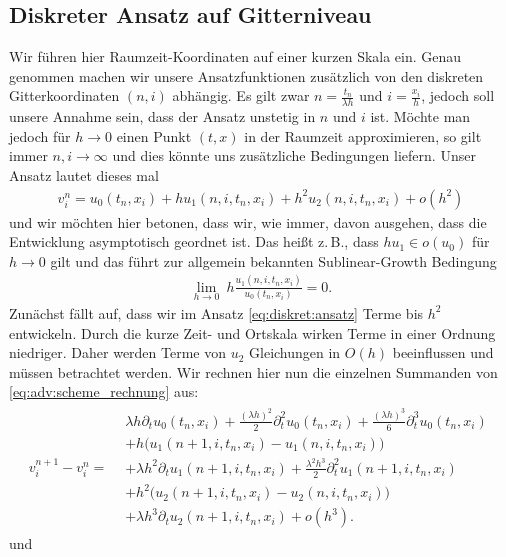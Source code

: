 \subsection {Diskreter Ansatz auf Gitterniveau} \label{sec:diskret}

Wir führen hier Raumzeit-Koordinaten auf einer kurzen Skala ein.
Genau genommen machen wir unsere Ansatzfunktionen zusätzlich von den diskreten Gitterkoordinaten $(n,i)$ abhängig.
Es gilt zwar $n = \frac {t_n} {\lambda h}$ und $i = \frac {x_i}{h}$, jedoch soll unsere Annahme sein, dass der Ansatz unstetig in $n$ und $i$ ist.
Möchte man jedoch für $h \to 0$ einen Punkt $(t,x)$ in der Raumzeit approximieren, so gilt immer $n,i \to \infty$ und dies könnte uns zusätzliche Bedingungen liefern.
Unser Ansatz lautet dieses mal
\begin{align}\label{eq:diskret:ansatz}
v^n_i = u_0(t_n, x_i) + h u_1(n, i, t_n, x_i) + h^2 u_2(n, i, t_n, x_i) + o(h^2)
\end{align}
und wir möchten hier betonen, dass wir, wie immer, davon ausgehen, dass die Entwicklung asymptotisch geordnet ist.
Das heißt z.\,B., dass $h u_1 \in o(u_0)$ für $h \to 0$ gilt und das führt zur allgemein bekannten Sublinear-Growth Bedingung
\begin{align}\label{eq:diskret:sublineargrowth}
\lim_{h \to 0} \: h \frac{u_1(n, i, t_n, x_i)}{u_0(t_n, x_i)} = 0.
\end{align}
Zunächst fällt auf, dass wir im Ansatz \eqref{eq:diskret:ansatz} Terme bis $h^2$ entwickeln.
Durch die kurze Zeit- und Ortskala wirken Terme in einer Ordnung niedriger.
Daher werden Terme von $u_2$ Gleichungen in $O(h)$ beeinflussen und müssen betrachtet werden.
Wir rechnen hier nun die einzelnen Summanden von \eqref{eq:adv:scheme_rechnung} aus:
{
\begin{align} \label{eq:diskret:diff1}
v^{n+1}_i - v^n_i =
\begin{split}
&\lambda h \partial_t u_0(t_n, x_i) + \frac {(\lambda h)^2}{2} \partial^2_t u_0(t_n, x_i) + \frac {(\lambda h)^3}{6} \partial^3_t u_0(t_n, x_i)\\
&+ h \bigl( u_1(n+1, i, t_n, x_i) - u_1(n, i, t_n, x_i) \bigr)\\
&+ \lambda h^2 \partial_t u_1(n+1, i, t_n, x_i) + \frac {\lambda^2 h^3}{2} \partial^2_t u_1(n+1, i, t_n, x_i)\\
&+ h^2 \bigl( u_2(n+1, i, t_n, x_i) - u_2(n, i, t_n, x_i) \bigr)\\
&+ \lambda h^3 \partial_t u_2(n+1, i, t_n, x_i) + o(h^3).
\end{split}
\end{align}
} und
